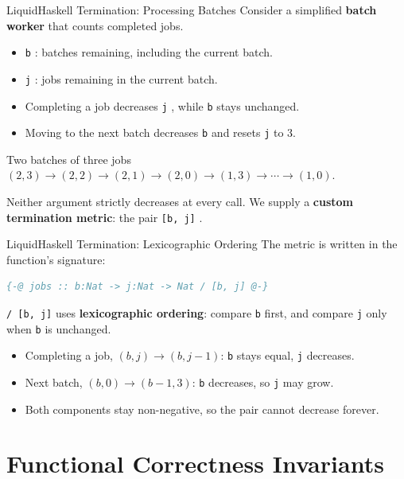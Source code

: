 \documentclass[aspectratio=169]{beamer}
\let\originaltexttt\texttt
\renewcommand{\texttt}[1]{%
  \begingroup
  \setlength{\fboxsep}{2pt}%
  \colorbox{themeTrack!65}{%
    \textcolor{themeText}{\originaltexttt{#1}}%
  }%
  \endgroup
}
\begin{document}
\begin{frame}{LiquidHaskell Termination: Processing Batches}
	Consider a simplified \textbf{batch worker} that counts completed jobs.

	\begin{itemize}
		\item \texttt{b}: batches remaining, including the current batch.
		\item \texttt{j}: jobs remaining in the current batch.
		\item Completing a job decreases \texttt{j}, while \texttt{b} stays unchanged.
		\item Moving to the next batch decreases \texttt{b} and resets \texttt{j} to 3.
	\end{itemize}

	\begin{exampleblock}{Two batches of three jobs}
		\vspace{0.1em}
		\((2,3) \to (2,2) \to (2,1) \to (2,0) \to (1,3) \to \cdots \to (1,0)\).

		\medskip
		Neither argument strictly decreases at every call. We supply a \textbf{custom termination metric}: the pair \texttt{[b, j]}.
	\end{exampleblock}
\end{frame}

\begin{frame}[fragile]{LiquidHaskell Termination: Lexicographic Ordering}
	The metric is written in the function's signature:

	\begin{lstlisting}[language=Haskell]
{-@ jobs :: b:Nat -> j:Nat -> Nat / [b, j] @-}
\end{lstlisting}

	\texttt{/ [b, j]} uses \textbf{lexicographic ordering}: compare \texttt{b} first, and compare \texttt{j} only when \texttt{b} is unchanged.

	\begin{itemize}
		\item Completing a job, \((b, j) \to (b, j-1)\): \texttt{b} stays equal, \texttt{j} decreases.
		\item Next batch, \((b, 0) \to (b-1, 3)\): \texttt{b} decreases, so \texttt{j} may grow.
		\item Both components stay non-negative, so the pair cannot decrease forever.
	\end{itemize}
\end{frame}

\section{Functional Correctness Invariants}
\end{document}
